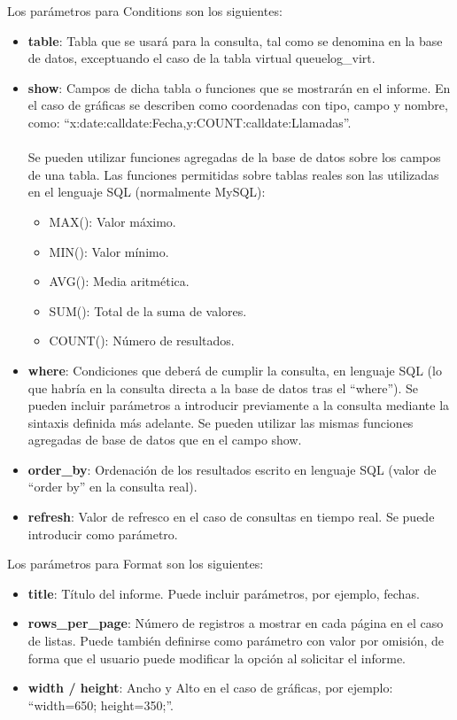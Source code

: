\documentclass[spanish,12pt]{book}
\begin{document}
Los parámetros para Conditions son los siguientes:
\begin{itemize}
\item {\bf table}: Tabla que se usará para la consulta, tal como se denomina en la base de datos, exceptuando el caso de la tabla virtual queuelog\_virt.
\item {\bf show}: Campos de dicha tabla o funciones que se mostrarán en el informe. En el caso de gráficas se describen como coordenadas con tipo, campo y nombre, como: ``x:date:calldate:Fecha,y:COUNT:calldate:Llamadas''.\\\\Se pueden utilizar funciones agregadas de la base de datos sobre los campos de una tabla. Las funciones permitidas sobre tablas reales son las utilizadas en el lenguaje SQL (normalmente MySQL):
	\begin{itemize}
	\item MAX(): Valor máximo.
	\item MIN(): Valor mínimo.
	\item AVG(): Media aritmética.
	\item SUM(): Total de la suma de valores.
	\item COUNT(): Número de resultados.
	\end{itemize}
\item {\bf where}: Condiciones que deberá de cumplir la consulta, en lenguaje SQL (lo que habría en la consulta directa a la base de datos tras el ``where''). Se pueden incluir parámetros a introducir previamente a la consulta mediante la sintaxis definida más adelante. Se pueden utilizar las mismas funciones agregadas de base de datos que en el campo show.
\item {\bf order\_by}: Ordenación de los resultados escrito en lenguaje SQL (valor de ``order by'' en la consulta real).
\item {\bf refresh}: Valor de refresco en el caso de consultas en tiempo real. Se puede introducir como parámetro.
\end{itemize}

Los parámetros para Format son los siguientes:
\begin{itemize}
\item {\bf title}: Título del informe. Puede incluir parámetros, por ejemplo, fechas.
\item {\bf rows\_per\_page}: Número de registros a mostrar en cada página en el caso de listas. Puede también definirse como parámetro con valor por omisión, de forma que el usuario puede modificar la opción al solicitar el informe.
\item {\bf width / height}: Ancho y Alto en el caso de gráficas, por ejemplo: ``width=650; height=350;''.
\end{itemize}
\end{document}
